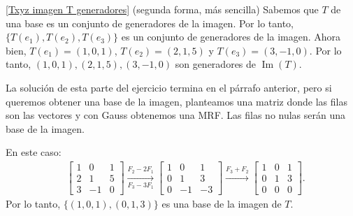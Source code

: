 \begin{enumerate}[topsep=6pt, itemsep=.4cm]
    \ref{Txyz imagen T generadores} (segunda forma, más sencilla) Sabemos que $T$ de una base es un conjunto de generadores de la imagen. Por lo tanto, $\{T(e_1),T(e_2),T(e_3)\}$ es un conjunto de generadores de la imagen. Ahora bien, $T(e_1) = (1,0,1)$, $T(e_2) = (2,1,5)$ y $T(e_3) = (3,-1,0)$. Por lo tanto,  $(1,0,1),(2,1,5), (3,-1,0)$ son generadores de $\operatorname{Im}(T)$.

    La solución de esta parte del ejercicio termina en el párrafo anterior, pero si queremos obtener una base de la imagen, planteamos una matriz donde las filas son las vectores y con Gauss obtenemos una MRF. Las filas no nulas serán una base de la imagen.
    
    En  este caso:
    \begin{align*}
        &\begin{bmatrix}
            1 & 0 & 1 \\
            2 & 1 & 5\\
            3 & -1 & 0
        \end{bmatrix}
        \underset{F_3-3F_1}{\stackrel{F_2-2F_1}{\longrightarrow}}
        \begin{bmatrix}
            1 & 0 & 1 \\
            0 & 1 & 3\\
            0 & -1 & -3
        \end{bmatrix}
        \stackrel{F_3+F_2}{\longrightarrow}
        \begin{bmatrix}
            1 & 0 & 1 \\
            0 & 1 & 3\\
            0 & 0 & 0
        \end{bmatrix}.    
    \end{align*}
    Por lo tanto, $\{(1,0,1),(0,1,3)\}$ es una base de la imagen de $T$.



\end{enumerate}
